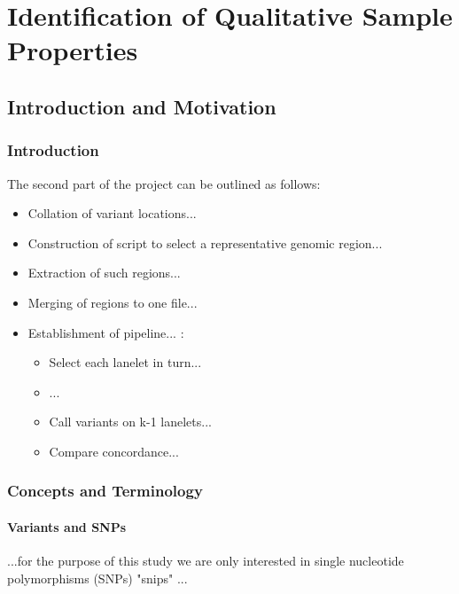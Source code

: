 \part{Identification of Qualitative Sample Properties}
\chapter{Introduction and Motivation}
\ifpdf
    \graphicspath{{Chapter5/Figs/Raster/}{Chapter5/Figs/PDF/}{Chapter5/Figs/}}
\else
    \graphicspath{{Chapter5/Figs/Vector/}{Chapter5/Figs/}}
\fi

\section{Introduction}

The second part of the project can be outlined as follows:

\begin{itemize}
    \item Collation of variant locations...
    \item Construction of script to select a representative genomic region...
    \item Extraction of such regions...
    \item Merging of regions to one file...
    \item Establishment of pipeline... :
    \begin{itemize}
        \item Select each lanelet in turn...
        \item ...
        \item Call variants on k-1 lanelets...
        \item Compare concordance...
    \end{itemize}
\end{itemize}

\section{Concepts and Terminology}

\subsection{Variants and SNPs}
...for the purpose of this study we are only interested in single nucleotide
polymorphisms (SNPs) "snips" ...

